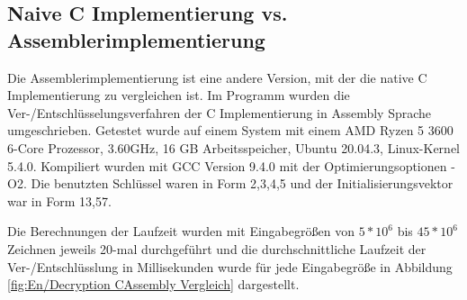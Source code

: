 \documentclass[course=erap]{aspdoc}
\begin{document}
\subsection{Naive C Implementierung vs. Assemblerimplementierung}
Die Assemblerimplementierung ist eine andere Version, mit der die native C Implementierung zu vergleichen ist. Im Programm wurden die Ver-/Entschlüsselungsverfahren der C Implementierung in Assembly Sprache umgeschrieben. Getestet wurde auf einem System mit einem AMD Ryzen 5 3600 6-Core Prozessor, 3.60GHz, 16 GB Arbeitsspeicher, Ubuntu 20.04.3, Linux-Kernel 5.4.0. Kompiliert wurden mit GCC Version 9.4.0 mit der Optimierungsoptionen -O2. Die benutzten Schlüssel waren in Form 2,3,4,5 und der Initialisierungsvektor war in Form 13,57.

Die Berechnungen der Laufzeit wurden mit Eingabegrößen von $5*10^6$ bis $45*10^6$ Zeichnen jeweils 20-mal durchgeführt und die durchschnittliche Laufzeit der Ver-/Entschlüsslung in Millisekunden wurde für jede Eingabegröße in Abbildung \ref{fig:En/Decryption CAssembly Vergleich} dargestellt.
\end{document}
